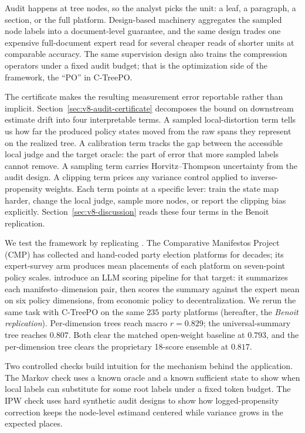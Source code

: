 Audit happens at tree nodes, so the analyst picks the unit: a
leaf, a paragraph, a section, or the full platform. Design-based
machinery aggregates the sampled node labels into a document-level
guarantee, and the same design trades one expensive full-document
expert read for several cheaper reads of shorter units at
comparable accuracy. The same supervision design also trains the
compression operators under a fixed audit budget; that is the
optimization side of the framework, the ``PO'' in C-TreePO.

The certificate makes the resulting measurement error reportable
rather than implicit. Section~\ref{sec:v8-audit-certificate}
decomposes the bound on downstream estimate drift into four
interpretable terms. A sampled local-distortion term tells us how
far the produced policy states moved from the raw spans they
represent on the realized tree. A calibration term tracks the gap
between the accessible local judge and the target oracle: the part
of error that more sampled labels cannot remove. A sampling term
carries Horvitz--Thompson uncertainty from the audit design. A
clipping term prices any variance control applied to
inverse-propensity weights. Each term points at a specific lever:
train the state map harder, change the local judge, sample more
nodes, or report the clipping bias explicitly.
Section~\ref{sec:v8-discussion} reads these four terms in the
Benoit replication.

We test the framework by replicating
\citet{BenoitEtAl2025}. The Comparative Manifestos Project (CMP) has
collected and hand-coded party election platforms for decades; its
expert-survey arm produces mean placements of each platform on
seven-point policy scales. \citet{BenoitEtAl2025} introduce an LLM
scoring pipeline for that target: it summarizes each
manifesto--dimension pair, then scores the summary against the
expert mean on six policy dimensions, from economic policy to
decentralization. We rerun the same task with C-TreePO on the same
\(235\) party platforms (hereafter, the \emph{Benoit replication}).
Per-dimension trees reach macro \(r=0.829\); the universal-summary
tree reaches \(0.807\). Both clear the matched open-weight baseline
at \(0.793\), and the per-dimension tree clears the proprietary
18-score ensemble at \(0.817\).

Two controlled checks build intuition for the mechanism behind the
application. The Markov check uses a known oracle and a known
sufficient state to show when local labels can substitute for some
root labels under a fixed token budget. The IPW check uses hard
synthetic audit designs to show how logged-propensity correction keeps
the node-level estimand centered while variance grows in the expected
places.

